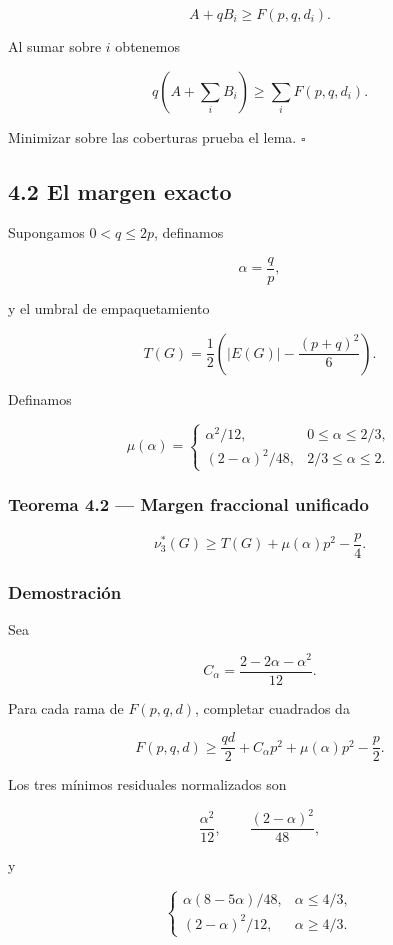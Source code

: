 \documentclass[
  11pt,
]{article}
\begin{document}
\[
A+qB_i\ge F(p,q,d_i).
\]

Al sumar sobre \(i\) obtenemos

\[
q\left(A+\sum_iB_i\right)
\ge
\sum_iF(p,q,d_i).
\]

Minimizar sobre las coberturas prueba el lema. \(\square\)

\subsection{4.2 El margen exacto}\label{el-margen-exacto}

Supongamos \(0<q\le2p\), definamos

\[
\alpha=\frac qp,
\]

y el umbral de empaquetamiento

\[
T(G)=\frac12\left(|E(G)|-\frac{(p+q)^2}{6}\right).
\tag{4.2}
\]

Definamos

\[
\mu(\alpha)
=
\begin{cases}
\alpha^2/12,&0\le\alpha\le2/3,\\
(2-\alpha)^2/48,&2/3\le\alpha\le2.
\end{cases}
\tag{4.3}
\]

\subsubsection{Teorema 4.2 --- Margen fraccional
unificado}\label{teorema-4.2-margen-fraccional-unificado}

\[
\boxed{
\nu_3^*(G)
\ge
T(G)+\mu(\alpha)p^2-\frac p4.
}
\tag{4.4}
\]

\subsubsection{Demostración}\label{demostraciuxf3n-2}

Sea

\[
C_\alpha=\frac{2-2\alpha-\alpha^2}{12}.
\]

Para cada rama de \(F(p,q,d)\), completar cuadrados da

\[
F(p,q,d)
\ge
\frac{qd}{2}+C_\alpha p^2+\mu(\alpha)p^2-\frac p2.
\tag{4.5}
\]

Los tres mínimos residuales normalizados son

\[
\frac{\alpha^2}{12},
\qquad
\frac{(2-\alpha)^2}{48},
\]

y

\[
\begin{cases}
\alpha(8-5\alpha)/48,&\alpha\le4/3,\\
(2-\alpha)^2/12,&\alpha\ge4/3.
\end{cases}
\]
\end{document}
